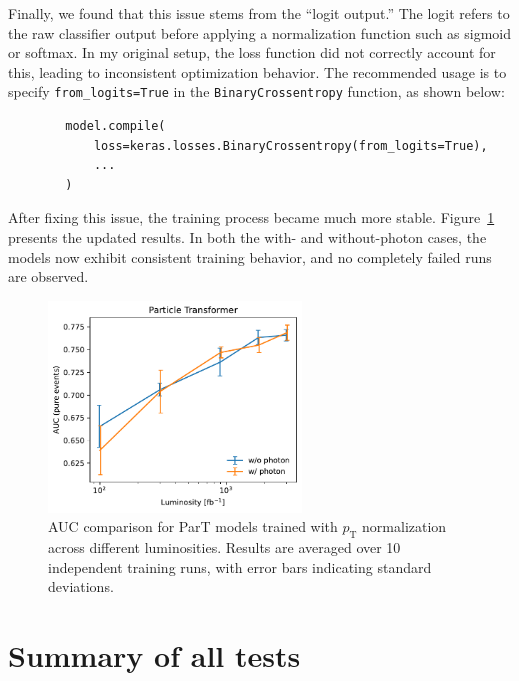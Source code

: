 \documentclass[12pt]{article}
\begin{document}
    Finally, we found that this issue stems from the ``logit output.'' The logit refers to the raw classifier output before applying a normalization function such as sigmoid or softmax. In my original setup, the loss function did not correctly account for this, leading to inconsistent optimization behavior. The recommended usage is to specify \verb|from_logits=True| in the \texttt{BinaryCrossentropy} function, as shown below:
    \begin{verbatim}
        model.compile(
            loss=keras.losses.BinaryCrossentropy(from_logits=True),
            ...
        )
    \end{verbatim}
    After fixing this issue, the training process became much more stable. Figure~\ref{fig:ParT_AUC_various_L_pTnorm_logit} presents the updated results. In both the with- and without-photon cases, the models now exhibit consistent training behavior, and no completely failed runs are observed.
    \begin{figure}[htpb]
        \centering
        \includegraphics[width=0.60\textwidth]{ParT_AUC-true_L-pTnorm_logit.pdf}
        \caption{AUC comparison for ParT models trained with $p_{\text{T}}$ normalization across different luminosities. Results are averaged over 10 independent training runs, with error bars indicating standard deviations.}
        \label{fig:ParT_AUC_various_L_pTnorm_logit}
    \end{figure}

\section{Summary of all tests}%
\label{sec:summary_of_all_tests}
\end{document}
